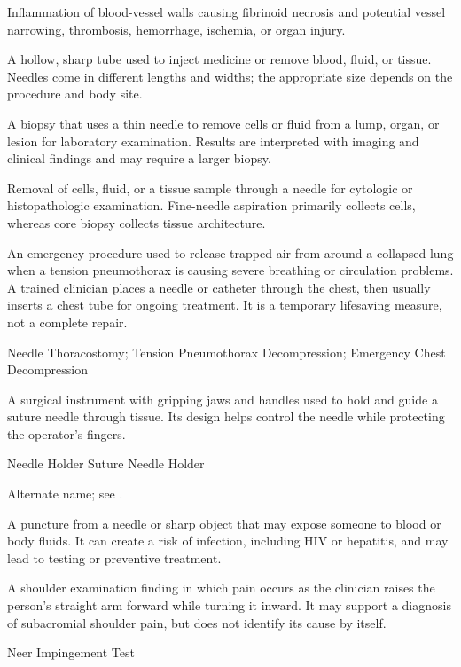  Inflammation of blood-vessel walls causing fibrinoid necrosis and potential vessel narrowing, thrombosis, hemorrhage, ischemia, or organ injury.

 A hollow, sharp tube used to inject medicine or remove blood, fluid, or tissue. Needles come in different lengths and widths; the appropriate size depends on the procedure and body site.

 A biopsy that uses a thin needle to remove cells or fluid from a lump, organ, or lesion for laboratory examination. Results are interpreted with imaging and clinical findings and may require a larger biopsy.

 Removal of cells, fluid, or a tissue sample through a needle for cytologic or histopathologic examination. Fine-needle aspiration primarily collects cells, whereas core biopsy collects tissue architecture.

 An emergency procedure used to release trapped air from around a collapsed lung when a tension pneumothorax is causing severe breathing or circulation problems. A trained clinician places a needle or catheter through the chest, then usually inserts a chest tube for ongoing treatment. It is a temporary lifesaving measure, not a complete repair.

\synonyms
Needle Thoracostomy; Tension Pneumothorax Decompression; Emergency Chest Decompression

 A surgical instrument with gripping jaws and handles used to hold and guide a suture needle through tissue. Its design helps control the needle while protecting the operator's fingers.

\synonyms
Needle Holder
Suture Needle Holder

 Alternate name; see .

 A puncture from a needle or sharp object that may expose someone to blood or body fluids. It can create a risk of infection, including HIV or hepatitis, and may lead to testing or preventive treatment.

 A shoulder examination finding in which pain occurs as the clinician raises the person's straight arm forward while turning it inward. It may support a diagnosis of subacromial shoulder pain, but does not identify its cause by itself.

\synonyms
Neer Impingement Test

